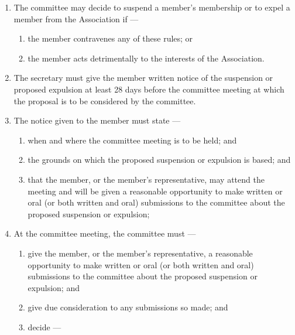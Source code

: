 \documentclass[../constitution.tex]{subfiles}
\begin{document}
\begin{enumerate}

\item The committee may decide to suspend a member's membership or to expel a member from the Association if ---

  \begin{enumerate}
  
  \item the member contravenes any of these rules; or
  \item the member acts detrimentally to the interests of the Association.
  \end{enumerate}
\item The secretary must give the member written notice of the suspension or proposed expulsion at least 28 days before the committee meeting at which the proposal is to be considered by the committee.
\item The notice given to the member must state ---

  \begin{enumerate}
  
  \item when and where the committee meeting is to be held; and
  \item the grounds on which the proposed suspension or expulsion is based; and
  \item that the member, or the member's representative, may attend the meeting and will be given a reasonable opportunity to make written or oral (or both written and oral) submissions to the committee about the proposed suspension or expulsion;
  \end{enumerate}
\item At the committee meeting, the committee must ---

  \begin{enumerate}
  
  \item give the member, or the member's representative, a reasonable opportunity to make written or oral (or both written and oral) submissions to the committee about the proposed suspension or expulsion; and
  \item give due consideration to any submissions so made; and
  \item decide ---

    \begin{enumerate}
    

\end{enumerate}
\end{enumerate}
\end{enumerate}
\end{document}
